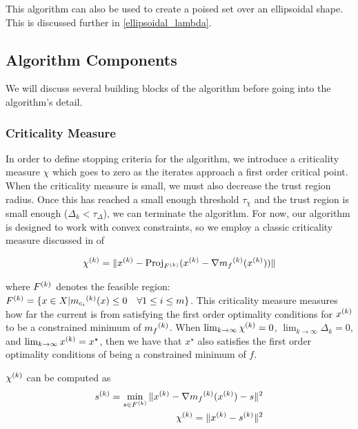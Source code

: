 This algorithm can also be used to create a poised set over an ellipsoidal shape.
This is discussed further in \cref{ellipsoidal_lambda}.

\subsection{Algorithm Components}

We will discuss several building blocks of the algorithm before going into the algorithm's detail.

\subsubsection{Criticality Measure}

In order to define stopping criteria for the algorithm, we introduce a criticality measure $\chi$ which goes to zero as the iterates approach a first order critical point.
When the criticality measure is small, we must also decrease the trust region radius.
Once this has reached a small enough threshold $\tau_{\chi}$ and the trust region is small enough ($\Delta_k < \tau_{\Delta}$), we can terminate the algorithm.
For now, our algorithm is designed to work with convex constraints, so we employ a classic criticality measure discussed in \cite{ConnGoulToin00} of

\begin{align*}
{\chi^{(k)}} = \|{x^{(k)}} - \text{Proj}_{{F}^{(k)}}({x^{(k)}}- \nabla {{m}_f}^{(k)}({x^{(k)}}))\|
\end{align*}

where ${F}^{(k)}$ denotes the feasible region: ${F}^{(k)} = \{x \in X | {{m}_{c_i}}^{(k)}(x) \le 0 \quad \forall 1 \le i \le m \}$.
This criticality measure measures how far the current is from satisfying the first order optimality conditions for ${x^{(k)}}$ to be a constrained minimum of ${{m}_f}^{(k)}$.
When $ \lim_{k\to\infty} {\chi^{(k)}} = 0$, $\lim_{k\to\infty}\Delta_k = 0$, and $\lim_{k\to\infty}{x^{(k)}} = x^{\star}$, then we have that $x^{\star}$ also satisfies the first order optimality conditions of being a constrained minimum of $f$.


${\chi^{(k)}}$ can be computed as 
\begin{align}
\label{critical}
{{s}^{(k)}} = \min_{s \in {F}^{(k)}} \|{x^{(k)}} - \nabla {{m}_f}^{(k)}({x^{(k)}}) - s\|^2 \\
{\chi^{(k)}} = \|{x^{(k)}} - {{s}^{(k)}} \|^2 \\
\end{align}

